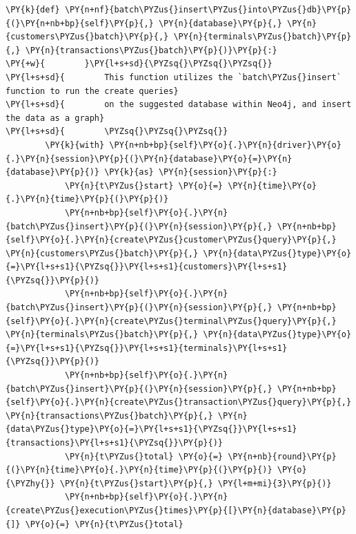 \begin{tcolorbox}[breakable, size=fbox, boxrule=1pt, pad at break*=1mm,colback=cellbackground, colframe=cellborder]
\begin{Verbatim}[commandchars=\\\{\}]
    \PY{k}{def} \PY{n+nf}{batch\PYZus{}insert\PYZus{}into\PYZus{}db}\PY{p}{(}\PY{n+nb+bp}{self}\PY{p}{,} \PY{n}{database}\PY{p}{,} \PY{n}{customers\PYZus{}batch}\PY{p}{,} \PY{n}{terminals\PYZus{}batch}\PY{p}{,} \PY{n}{transactions\PYZus{}batch}\PY{p}{)}\PY{p}{:}
\PY{+w}{        }\PY{l+s+sd}{\PYZsq{}\PYZsq{}\PYZsq{}}
\PY{l+s+sd}{        This function utilizes the `batch\PYZus{}insert` function to run the create queries}
\PY{l+s+sd}{        on the suggested database within Neo4j, and insert the data as a graph}
\PY{l+s+sd}{        \PYZsq{}\PYZsq{}\PYZsq{}}
        \PY{k}{with} \PY{n+nb+bp}{self}\PY{o}{.}\PY{n}{driver}\PY{o}{.}\PY{n}{session}\PY{p}{(}\PY{n}{database}\PY{o}{=}\PY{n}{database}\PY{p}{)} \PY{k}{as} \PY{n}{session}\PY{p}{:}
            \PY{n}{t\PYZus{}start} \PY{o}{=} \PY{n}{time}\PY{o}{.}\PY{n}{time}\PY{p}{(}\PY{p}{)}
            \PY{n+nb+bp}{self}\PY{o}{.}\PY{n}{batch\PYZus{}insert}\PY{p}{(}\PY{n}{session}\PY{p}{,} \PY{n+nb+bp}{self}\PY{o}{.}\PY{n}{create\PYZus{}customer\PYZus{}query}\PY{p}{,} \PY{n}{customers\PYZus{}batch}\PY{p}{,} \PY{n}{data\PYZus{}type}\PY{o}{=}\PY{l+s+s1}{\PYZsq{}}\PY{l+s+s1}{customers}\PY{l+s+s1}{\PYZsq{}}\PY{p}{)}
            \PY{n+nb+bp}{self}\PY{o}{.}\PY{n}{batch\PYZus{}insert}\PY{p}{(}\PY{n}{session}\PY{p}{,} \PY{n+nb+bp}{self}\PY{o}{.}\PY{n}{create\PYZus{}terminal\PYZus{}query}\PY{p}{,} \PY{n}{terminals\PYZus{}batch}\PY{p}{,} \PY{n}{data\PYZus{}type}\PY{o}{=}\PY{l+s+s1}{\PYZsq{}}\PY{l+s+s1}{terminals}\PY{l+s+s1}{\PYZsq{}}\PY{p}{)}
            \PY{n+nb+bp}{self}\PY{o}{.}\PY{n}{batch\PYZus{}insert}\PY{p}{(}\PY{n}{session}\PY{p}{,} \PY{n+nb+bp}{self}\PY{o}{.}\PY{n}{create\PYZus{}transaction\PYZus{}query}\PY{p}{,} \PY{n}{transactions\PYZus{}batch}\PY{p}{,} \PY{n}{data\PYZus{}type}\PY{o}{=}\PY{l+s+s1}{\PYZsq{}}\PY{l+s+s1}{transactions}\PY{l+s+s1}{\PYZsq{}}\PY{p}{)}
            \PY{n}{t\PYZus{}total} \PY{o}{=} \PY{n+nb}{round}\PY{p}{(}\PY{n}{time}\PY{o}{.}\PY{n}{time}\PY{p}{(}\PY{p}{)} \PY{o}{\PYZhy{}} \PY{n}{t\PYZus{}start}\PY{p}{,} \PY{l+m+mi}{3}\PY{p}{)}
            \PY{n+nb+bp}{self}\PY{o}{.}\PY{n}{create\PYZus{}execution\PYZus{}times}\PY{p}{[}\PY{n}{database}\PY{p}{]} \PY{o}{=} \PY{n}{t\PYZus{}total}


\end{Verbatim}
\end{tcolorbox}
